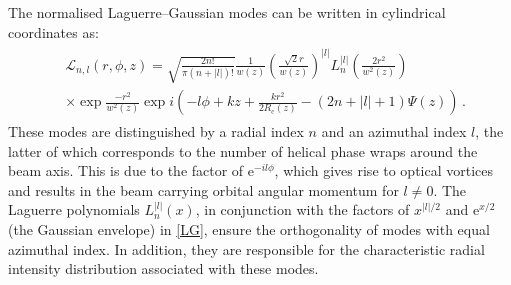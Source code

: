 \documentclass[../Thesis-IJspeert.tex]{subfiles}
\begin{document}
The normalised Laguerre--Gaussian modes can be written in cylindrical coordinates as:
\begin{align}
\label{LG}
\begin{split}
&\mathcal{L}_{n,l}(r, \phi, z) = \sqrt{\frac{2n!}{\pi (n+\lvert l\rvert)!}}\frac{1}{w(z)} \left(\frac{\sqrt{2}r}{w(z)} \right)^{\!\vert l \rvert} L_n^{\lvert l \rvert} \left(\frac{2r^2}{w^2(z)}\right) \\ &\times\exp{\frac{-r^2}{w^2(z)}}\exp{ i\left(-l\phi + kz + \frac{kr^2}{2R_\mathrm{c}(z)} - (2n+\lvert l \rvert +1)\Psi(z)\right)} \,.
\end{split}
\end{align}
These modes are distinguished by a radial index $n$ and an azimuthal index $l$, the latter of which corresponds to the number of helical phase wraps around the beam axis. This is due to the factor of $\mathrm{e}^{ -il\phi}$, which gives rise to optical vortices and results in the beam carrying orbital angular momentum for $l\neq0$. The Laguerre polynomials $L_n^{\lvert l \rvert}(x)$, in conjunction with the factors of $x^{\vert l \rvert/2}$ and $\mathrm{e}^{x/2}$ (the Gaussian envelope) in \autoref{LG}, ensure the orthogonality of modes with equal azimuthal index. In addition, they are responsible for the characteristic radial intensity distribution associated with these modes.
\end{document}

